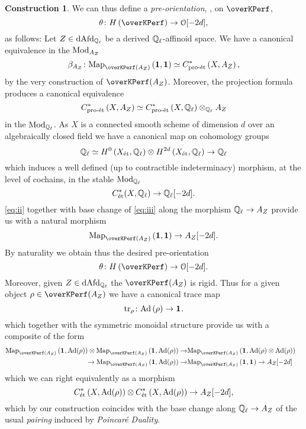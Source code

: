 \documentclass[10pt,a4paper]{amsart}
\numberwithin{equation}{subsection}
\theoremstyle{plain}
\theoremstyle{definition}
\newtheorem{construction}[theorem]{Construction}
\theoremstyle{remark}
\numberwithin{equation}{section}
\begin{document}
\begin{construction} \label{const:pair}
We can thus define a \emph{pre-orientation}, \cite[Definition 3.3]{toen_ss}, on $\overKPerf$,
	\[
		\theta \colon H \left( \overKPerf \right) \to \cO[-2d],
	\]
as follows: Let $Z \in \mathrm{dAfd}_{\mathbb{Q}_\ell}$ be a derived $\mathbb{Q}_\ell$-affinoid space. We have a canonical equivalence in the \infcat $\mathrm{Mod}_{A_Z}$
	\begin{equation} \label{eq:ii}
		 \beta_{A_Z} \colon \Map_{\overKPerf(A_Z)} \left(\mathbf 1, \mathbf 1 \right) \simeq C^*_{\text{pro-\et}} \left( X, A_Z \right),
	\end{equation}
by the very construction of $\overKPerf(A_Z)$. Moreover, the projection formula produces a canonical equivalence
	\[
		C^*_{\text{pro-\text{\'et}}} \left( X, A_Z \right) \simeq C^*_{\text{pro-\text{\'et}}} \left( X, \mathbb{Q}_\ell \right) \otimes_{\mathbb{Q}_\ell} A_Z
	\]
in the \infcat $\mathrm{Mod}_{\mathbb{Q}_\ell}$. As $X$ is a connected smooth scheme of dimension $d$ over an algebraically closed field we have a canonical map on cohomology groups
	\[
		\mathbb{Q}_\ell \simeq H^0 \left( X_{\text{\'et}}, \mathbb{Q}_\ell \right) \otimes H^{2d} \left( X_{\text{\'et}}, \mathbb{Q}_\ell \right) \to \mathbb{Q}_\ell 
	\]
which induces a well defined (up to contractible indeterminacy) morphism, at the level of cochains, in the stable \infcat $\mathrm{Mod}_{\mathbb{Q}_\ell}$
	\begin{equation} \label{eq:iii}
		C^*_{\text{\'et}}(X, \mathbb{Q}_\ell) \to \mathbb{Q}_\ell [-2d].
	\end{equation}
\eqref{eq:ii} together with base change of \eqref{eq:iii} along the morphism $\mathbb{Q}_\ell \to A_Z $ provide us with a natural morphism
	\[
	 	\Map_{\overKPerf(A_Z)} \left(\mathbf 1, \mathbf 1 \right) \to A_Z [-2d].
	\]
By naturality we obtain thus the desired pre-orientation
	\[
		\theta \colon H \left( \overKPerf \right) \to \cO[-2d].
	\]
Moreover, given $Z \in \mathrm{dAfd}_{\mathbb{Q}_\ell}$ the \infcat $\overKPerf(A_Z)$ is rigid. Thus for a given object $\rho \in \overKPerf(A_Z)$ we have a canonical trace map
	\[
		\mathrm{tr}_{\rho} \colon \mathrm{Ad} \left( \rho \right) \to \mathbf{1}_{		} .
	\]
which together with the symmetric monoidal structure provide us with a composite of the form
	\begin{align}
		 \Map_{\overKPerf(A_Z)} \left( 	\mathbf{1}_{} , \Ad(\rho) \right) \otimes \Map_{\overKPerf(A_Z)} \left(  \mathbf{1}_{} , \Ad( \rho) \right) \to & \Map_{\overKPerf(A_Z)} \left( \mathbf{1}_{} , \Ad(\rho)  \otimes \Ad (\rho) 	
		 \right)  \\ 
		\to \Map_{\overKPerf(A_Z)} \left( \mathbf 1, \Ad(\rho) \right)	 \to & \Map_{\overKPerf(A_Z)} \left( \mathbf{1}_{} , \mathbf{1}_{} \right) \to  A_Z[-2d] &	
	\end{align}
which we can right equivalently as a morphism
	\[
		C^*_{\text{\'et}} \left( X, \mathrm{Ad}(\rho) \right) \otimes C^*_{\text{\'et}} \left( X, \mathrm{Ad}(\rho) \right) \to A_Z[-2d],
	\]
which by our construction coincides with the base change along $\mathbb{Q}_\ell \to A_Z$ of the usual \emph{pairing} induced by \emph{Poincar\'e Duality}.
\end{construction}
\end{document}
